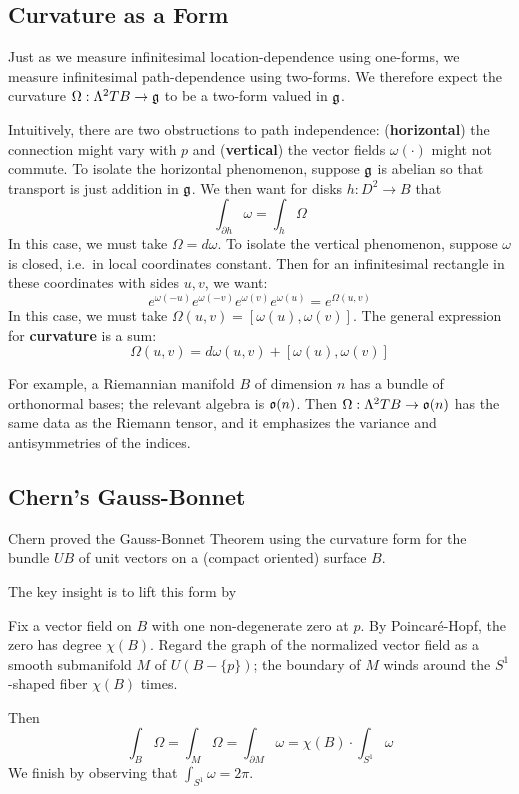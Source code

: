\documentclass[twocolumn, 11pt]{article}
\newcommand{\gG}{\frak{g}}
\newcommand{\oO}{\frak{o}}
\theoremstyle{definition}
\newcommand{\msec}[1]{\subsection*{\color{mblu}\textsf{#1}}}
\begin{document}
\newpage
    \msec{Curvature as a Form}
        Just as we measure infinitesimal location-dependence using one-forms,
        we measure infinitesimal path-dependence using two-forms.  We therefore
        expect the curvature $\Omega : \Lambda^2 TB \to \gG$ to be a two-form 
        valued in $\gG$.

        Intuitively, there are two obstructions to path independence:
        (\textbf{horizontal}) the connection might vary with $p$ and  
        (\textbf{vertical}) the vector fields $\omega(\cdot)$ might not
        commute.
        To isolate the horizontal phenomenon, suppose $\gG$ is
        abelian so that transport is just addition in $\gG$.  We then
        want for disks $h: D^2 \to B$ that
        $$
            \int_{\partial h} \omega = \int_h \Omega
        $$
        In this case, we must take $\Omega = d\omega$.
        To isolate the vertical phenomenon, suppose $\omega$ is closed, i.e.\
        in local coordinates constant.  Then for an
        infinitesimal rectangle in these coordinates with sides $u, v$, we
        want:
        $$
            e^{\omega(-u)}e^{\omega(-v)}e^{\omega(v)}e^{\omega(u)}
            =
            e^{\Omega(u,v)}
        $$
        In this case, we must take $\Omega(u,v) = [\omega(u), \omega(v)]$.
        The general expression for \textbf{curvature} is a sum:
        $$
            \Omega(u,v) = d\omega(u,v) + [\omega(u), \omega(v)]
        $$

        For example, a Riemannian manifold $B$ of dimension $n$ has a bundle of
        orthonormal bases; the relevant algebra is $\oO(n)$.  Then
        $\Omega:\Lambda^2 TB \to \oO(n)$ has the same data as the Riemann
        tensor, and it emphasizes the variance and antisymmetries of the
        indices. 

    \newpage
    \msec{Chern's Gauss-Bonnet}
        Chern proved the Gauss-Bonnet Theorem using the curvature form for the
        bundle $UB$ of unit vectors on a (compact oriented) surface $B$. 

        The key insight is to lift this form by   

        Fix a vector field on $B$ with one non-degenerate zero at $p$.
        By Poincar\'e-Hopf, the zero has degree $\chi(B)$. 
        Regard the graph of the normalized vector field as a smooth
        submanifold $M$ of $U(B - \{p\})$; the boundary of $M$ winds around
        the $S^1$-shaped fiber $\chi(B)$ times.

        Then
        $$
            \int_B \Omega = \int_M \Omega
                          = \int_{\partial M} \omega
                          = \chi(B) \cdot \int_{S^1} \omega
        $$
        We finish by observing that $\int_{S^1} \omega = 2\pi$.
\end{document}
